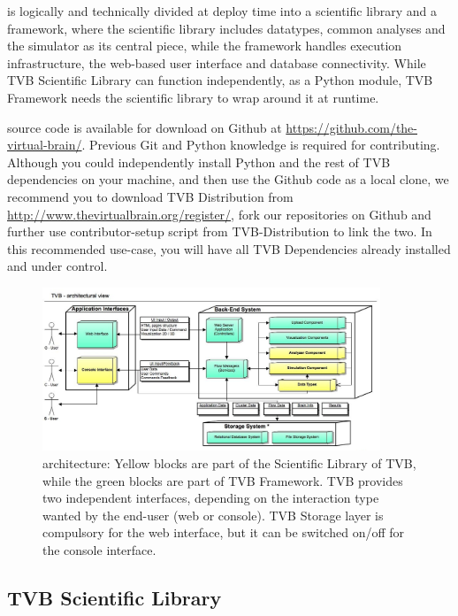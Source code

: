 
\TVB is logically and technically divided at deploy time into a scientific library and a framework, 
where the scientific library includes datatypes, common analyses and the simulator as its central piece,
while the framework handles execution infrastructure, the web-based user interface and database connectivity. 
While TVB Scientific Library can function independently, as a Python module, TVB Framework needs the scientific library to wrap around it at runtime.

\TVB source code is available for download on Github at \url{https://github.com/the-virtual-brain/}. Previous Git and Python knowledge is required for contributing.
Although you could independently install Python and the rest of TVB dependencies on your machine, and then use the Github code as a local clone, 
we recommend you to download TVB Distribution from \url{http://www.thevirtualbrain.org/register/}, fork our repositories on Github and further use
contributor-setup script from TVB-Distribution to link the two. In this recommended use-case, you will have all TVB Dependencies already installed 
 and under control.

 \begin{figure}
        \centering
        \includegraphics[width=0.90\textwidth]{images/architecture.jpg}
        \caption{\TVB architecture: 
        Yellow blocks are part of the Scientific Library of TVB, while the green blocks are part of TVB Framework.
        TVB provides two independent interfaces, depending on the interaction type wanted by the end-user (web or console).
        TVB Storage layer is compulsory for the web interface, but it can be switched on/off for the console interface.
         }
        \label{fig:architecture}
 \end{figure}


	\subsection{TVB Scientific Library}

